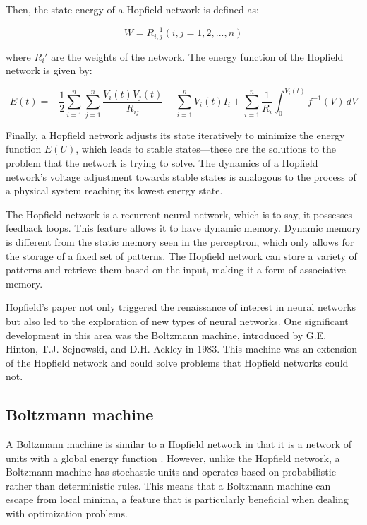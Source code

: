 \documentclass[paper=a4, fontsize=11pt]{scrartcl} %
\numberwithin{equation}{section} %
\numberwithin{figure}{section} %
\numberwithin{table}{section} %
\begin{document}
Then, the state energy of a Hopfield network is defined as:

\begin{equation}
W = R_{i,j}^{-1} (i,j=1,2,...,n)
\end{equation}

where \( R_i' \) are the weights of the network. The energy function of the Hopfield network is given by:

\begin{equation}
    E(t) = -\frac{1}{2} \sum_{i=1}^{n} \sum_{j=1}^{n} \frac{V_i(t)V_j(t)}{R_{ij}} - \sum_{i=1}^{n} V_i(t)I_i + \sum_{i=1}^{n} \frac{1}{R_i} \int_{0}^{V_i(t)} f^{-1}(V) \, dV
\end{equation}

Finally, a Hopfield network adjusts its state iteratively to minimize the energy function \( E(U) \), which leads to stable states—these are the solutions to the problem that the network is trying to solve. The dynamics of a Hopfield network's voltage adjustment towards stable states is analogous to the process of a physical system reaching its lowest energy state.

The Hopfield network is a recurrent neural network, which is to say, it possesses feedback loops. This feature allows it to have dynamic memory. Dynamic memory is different from the static memory seen in the perceptron, which only allows for the storage of a fixed set of patterns. The Hopfield network can store a variety of patterns and retrieve them based on the input, making it a form of associative memory.

Hopfield's paper not only triggered the renaissance of interest in neural networks but also led to the exploration of new types of neural networks. One significant development in this area was the Boltzmann machine, introduced by G.E. Hinton, T.J. Sejnowski, and D.H. Ackley in 1983. This machine was an extension of the Hopfield network and could solve problems that Hopfield networks could not.

\subsection{Boltzmann machine}

A Boltzmann machine is similar to a Hopfield network in that it is a network of units with a global energy function \cite{G.E.Hinton1986LearningAndfRelearning}. However, unlike the Hopfield network, a Boltzmann machine has stochastic units and operates based on probabilistic rather than deterministic rules. This means that a Boltzmann machine can escape from local minima, a feature that is particularly beneficial when dealing with optimization problems.
\end{document}
